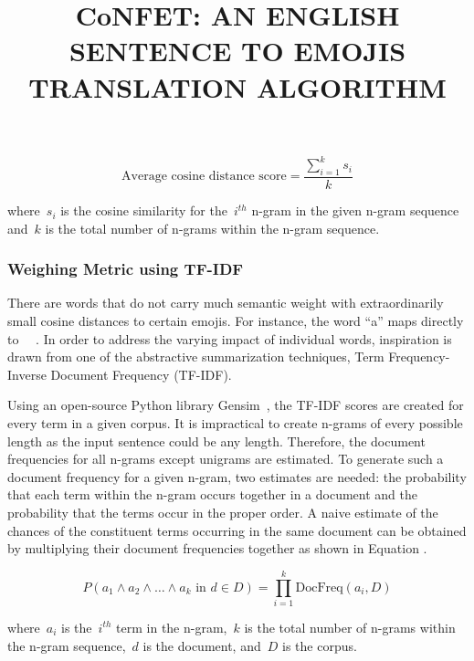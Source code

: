 \documentclass{article}[10]
\newcommand*{\img}[1]{%
  \raisebox{-.3\baselineskip}{%
    \texttt{[image: \#1]}%
  }%
} \title{{CoNFET:} AN ENGLISH SENTENCE TO EMOJIS TRANSLATION ALGORITHM}
\begin{document}
\begin{equation}
  \textrm{Average cosine distance score} = \frac{\sum_{i=1}^{k}s_{i}}{k} \label{eq:averageCosineDistance}
\end{equation}

where~\(s_{i}\) is the cosine similarity for the~\(i^{th}\) n-gram in the given
n-gram sequence and~\(k\) is the total number of n-grams within the n-gram
sequence.

\subsubsection{Weighing Metric using  TF-IDF\label{sec:TF-IDFWeighing}}

There are words that do not carry much semantic weight with extraordinarily
small cosine distances to certain emojis. For instance, the word ``a'' maps
directly to~~\img{emojis/1f4af.png}. In order to address the varying impact of
individual words, inspiration is drawn from one of the abstractive summarization
techniques, Term Frequency-Inverse Document Frequency (TF-IDF).

Using an open-source Python library Gensim~\cite{gensim}, the TF-IDF scores are
created for every term in a given corpus. It is impractical to create n-grams of
every possible length as the input sentence could be any length. Therefore, the
document frequencies for all n-grams except unigrams are estimated. To generate
such a document frequency for a given n-gram, two estimates are needed: the
probability that each term within the n-gram occurs together in a document and
the probability that the terms occur in the proper order. A naive estimate of
the chances of the constituent terms occurring in the same document can be
obtained by multiplying their document frequencies together as shown in Equation
.

\begin{equation}
  P(a_{1} \land a_{2} \land \ldots \land a_{k} \textrm{ in } d \in D) = \prod_{i=1}^{k}\textrm{DocFreq}(a_{i}, D) \label{eq:TF-IDFWeighing}
\end{equation}

where~\(a_{i}\) is the~\(i^{th}\) term in the n-gram,~\(k\) is the total number
of n-grams within the n-gram sequence,~\(d\) is the document, and~\(D\) is the
corpus.
\end{document}
